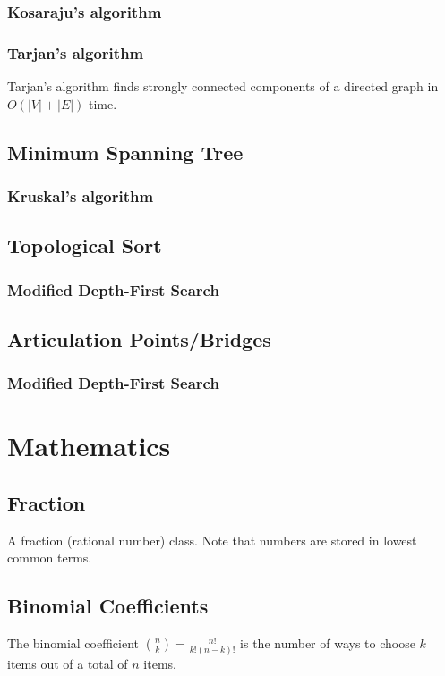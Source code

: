 \documentclass[11pt,a4paper,titlepage]{article}
\begin{document}
			\subsubsection{Kosaraju's algorithm}
			\subsubsection{Tarjan's algorithm}
				Tarjan's algorithm finds strongly connected components of a directed graph in $O(|V|+|E|)$ time.
				
		\subsection{Minimum Spanning Tree}
			\subsubsection{Kruskal's algorithm}
				
		\subsection{Topological Sort}
			\subsubsection{Modified Depth-First Search}
				
		\subsection{Articulation Points/Bridges}
			\subsubsection{Modified Depth-First Search}

	\section{Mathematics}

		\subsection{Fraction}
			A fraction (rational number) class. Note that numbers are stored in lowest common terms.
			

		\subsection{Binomial Coefficients}
			The binomial coefficient $\binom{n}{k} = \frac{n!}{k!(n-k)!}$ is the number of ways to choose $k$ items out of a total of $n$ items.
\end{document}
